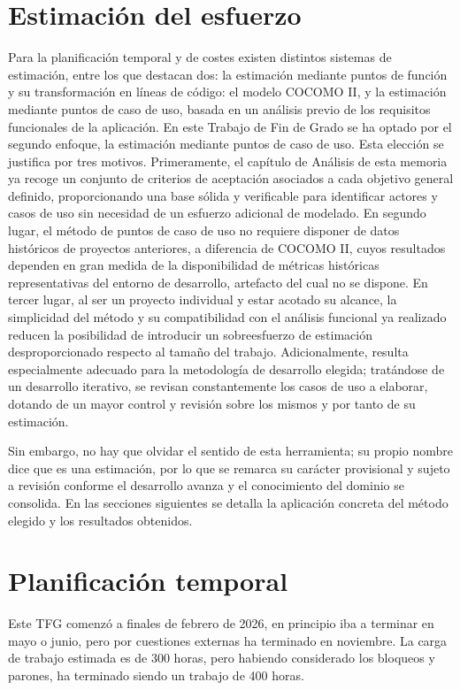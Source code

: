 \section{Estimación del esfuerzo}
Para la planificación temporal y de costes existen distintos sistemas de estimación, entre los que destacan dos: la estimación mediante puntos de función y su transformación en líneas de código: el modelo COCOMO II, y la estimación mediante puntos de caso de uso, basada en un análisis previo de los requisitos funcionales de la aplicación.
En este Trabajo de Fin de Grado se ha optado por el segundo enfoque, la estimación mediante puntos de caso de uso. Esta elección se justifica por tres motivos. Primeramente, el capítulo de Análisis de esta memoria ya recoge un conjunto de criterios de aceptación asociados a cada objetivo general definido, proporcionando una base sólida y verificable para identificar actores y casos de uso sin necesidad de un esfuerzo adicional de modelado. En segundo lugar, el método de puntos de caso de uso no requiere disponer de datos históricos de proyectos anteriores, a diferencia de COCOMO II, cuyos resultados dependen en gran medida de la disponibilidad de métricas históricas representativas del entorno de desarrollo, artefacto del cual no se dispone. En tercer lugar, al ser un proyecto individual y estar acotado su alcance, la simplicidad del método y su compatibilidad con el análisis funcional ya realizado reducen la posibilidad de introducir un sobreesfuerzo de estimación desproporcionado respecto al tamaño del trabajo. Adicionalmente, resulta especialmente adecuado para la metodología de desarrollo elegida; tratándose de un desarrollo iterativo, se revisan constantemente los casos de uso a elaborar, dotando de un mayor control y revisión sobre los mismos y por tanto de su estimación.

Sin embargo, no hay que olvidar el sentido de esta herramienta; su propio nombre dice que es una estimación, por lo que se remarca su carácter provisional y sujeto a revisión conforme el desarrollo avanza y el conocimiento del dominio se consolida. En las secciones siguientes se detalla la aplicación concreta del método elegido y los resultados obtenidos.
\section{Planificación temporal}
Este TFG comenzó a finales de febrero de 2026, en principio iba a terminar en mayo o junio, pero por cuestiones externas ha terminado en noviembre. La carga de trabajo estimada es de 300 horas, pero habiendo considerado los bloqueos y parones, ha terminado siendo un trabajo de 400 horas.
